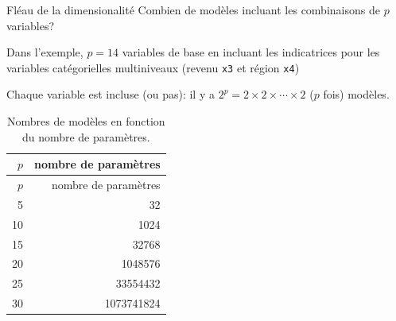 \documentclass[
  ignorenonframetext,
]{beamer}
\begin{document}
\begin{frame}[fragile]{Fléau de la dimensionalité}
\protect\hypertarget{fluxe9au-de-la-dimensionalituxe9}{}
Combien de modèles incluant les combinaisons de \(p\) variables?

Dans l'exemple, \(p=14\) variables de base en incluant les indicatrices
pour les variables catégorielles multiniveaux (revenu \texttt{x3} et
région \texttt{x4})

Chaque variable est incluse (ou pas): il y a
\(2^p=2\times 2 \times \cdots \times 2\) (\(p\) fois) modèles.

\hypertarget{tbl-02-table3}{}
\begin{longtable}[]{@{}rr@{}}
\caption{\label{tbl-02-table3}Nombres de modèles en fonction du nombre
de paramètres.}\tabularnewline
\toprule()
\(p\) & nombre de paramètres \\
\midrule()
\endfirsthead
\toprule()
\(p\) & nombre de paramètres \\
\midrule()
\endhead
5 & 32 \\
10 & 1024 \\
15 & 32768 \\
20 & 1048576 \\
25 & 33554432 \\
30 & 1073741824 \\
\bottomrule()
\end{longtable}
\end{frame}
\end{document}
